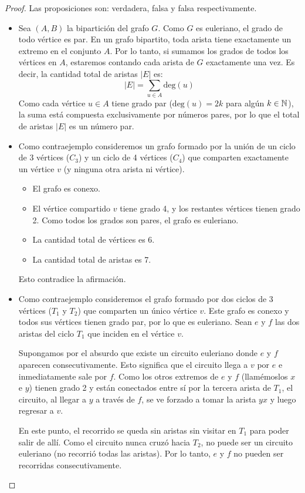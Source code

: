 \begin{proof}
    Las proposiciones son: verdadera, falsa y falsa respectivamente.
    \begin{itemize}
        \item Sea \((A, B)\) la bipartición del grafo \(G\). Como \(G\) es euleriano, el grado de todo vértice es par. En un grafo bipartito, toda arista tiene exactamente un extremo en el conjunto \(A\). Por lo tanto, si sumamos los grados de todos los vértices en \(A\), estaremos contando cada arista de \(G\) exactamente una vez. Es decir, la cantidad total de aristas \(|E|\) es:
              \[
                  |E| = \sum_{u \in A} \text{deg}(u)
              \]
              Como cada vértice \(u \in A\) tiene grado par (\(\text{deg}(u) = 2k\) para algún \( k \in \mathbb{N} \)), la suma está compuesta exclusivamente por números pares, por lo que el total de aristas \(|E|\) es un número par.

        \item Como contraejemplo consideremos un grafo formado por la unión de un ciclo de 3 vértices (\(C_3\)) y un ciclo de 4 vértices (\(C_4\)) que comparten exactamente un vértice \(v\) (y ninguna otra arista ni vértice).
              \begin{itemize}
                  \item El grafo es conexo.
                  \item El vértice compartido \(v\) tiene grado 4, y los restantes vértices tienen grado 2. Como todos los grados son pares, el grafo es euleriano.
                  \item La cantidad total de vértices es 6.
                  \item La cantidad total de aristas es  7.
              \end{itemize}
              Esto contradice la afirmación.

        \item Como contraejemplo consideremos el grafo formado por dos ciclos de 3 vértices (\(T_1\) y \(T_2\)) que comparten un único vértice \(v\). Este grafo es conexo y todos sus vértices tienen grado par, por lo que es euleriano.
              Sean \(e\) y \(f\) las dos aristas del ciclo \(T_1\) que inciden en el vértice \(v\).

              Supongamos por el absurdo que existe un circuito euleriano donde \(e\) y \(f\) aparecen consecutivamente.
              Esto significa que el circuito llega a \(v\) por \(e\) e inmediatamente sale por \(f\). Como los otros extremos de \(e\) y \(f\) (llamémoslos \(x\) e \(y\)) tienen grado 2 y están conectados entre sí por la tercera arista de \(T_1\), el circuito, al llegar a \(y\) a través de \(f\), se ve forzado a tomar la arista \(yx\) y luego regresar a \(v\).

              En este punto, el recorrido se queda sin aristas sin visitar en \(T_1\) para poder salir de allí. Como el circuito nunca cruzó hacia \(T_2\), no puede ser un circuito euleriano (no recorrió todas las aristas). Por lo tanto, \(e\) y \(f\) no pueden ser recorridas consecutivamente.

    \end{itemize}
\end{proof}

